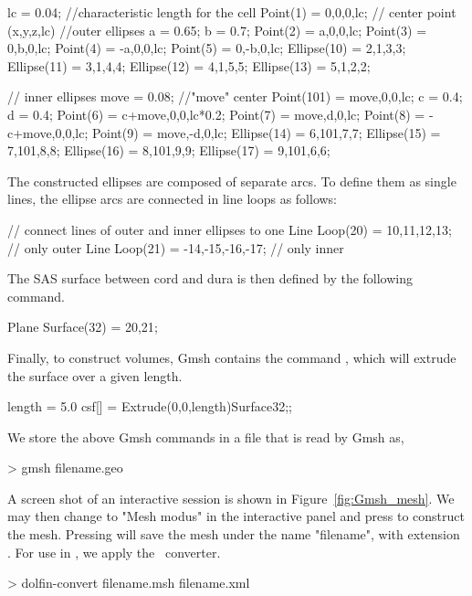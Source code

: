 \begin{gencode}
lc = 0.04;  //characteristic length for the cell 
Point(1) = {0,0,0,lc};	// center point (x,y,z,lc) 
//outer ellipses
a = 0.65;
b = 0.7;
Point(2) = {a,0,0,lc};
Point(3) = {0,b,0,lc};
Point(4) = {-a,0,0,lc};
Point(5) = {0,-b,0,lc};
Ellipse(10) = {2,1,3,3};
Ellipse(11) = {3,1,4,4};
Ellipse(12) = {4,1,5,5};
Ellipse(13) = {5,1,2,2};

// inner ellipses
move = 0.08; //"move" center
Point(101) = {move,0,0,lc};
c = 0.4;
d = 0.4;
Point(6) = {c+move,0,0,lc*0.2};
Point(7) = {move,d,0,lc};
Point(8) = {-c+move,0,0,lc};
Point(9) = {move,-d,0,lc};
Ellipse(14) = {6,101,7,7};
Ellipse(15) = {7,101,8,8};
Ellipse(16) = {8,101,9,9};
Ellipse(17) = {9,101,6,6};
\end{gencode}

The constructed ellipses are composed of separate arcs. To define them as single lines, the ellipse arcs are connected in line loops as follows: 

\begin{gencode}
// connect lines of outer and inner ellipses to one
Line Loop(20) = {10,11,12,13};		// only outer
Line Loop(21) = {-14,-15,-16,-17};	// only inner
\end{gencode}
The SAS surface between cord and dura is then defined by the following command.
\begin{gencode}
Plane Surface(32) = {20,21};
\end{gencode}

Finally, to construct volumes, Gmsh contains the command , which will extrude the surface over a given length.
\begin{gencode}
length = 5.0
csf[] = Extrude(0,0,length){Surface{32};};
\end{gencode}

We store the above Gmsh commands in a  file that is read by Gmsh as,   
\begin{bash}
> gmsh filename.geo
\end{bash}
A screen shot of an interactive session is shown in Figure~\ref{fig:Gmsh_mesh}. 
We may then change to "Mesh modus" in the interactive panel and press  to construct the mesh. Pressing  will save the mesh under the name "filename", with extension . For use in \dolfin, we apply the \dolfin\ converter.

\begin{bash}
> dolfin-convert filename.msh filename.xml
\end{bash}


